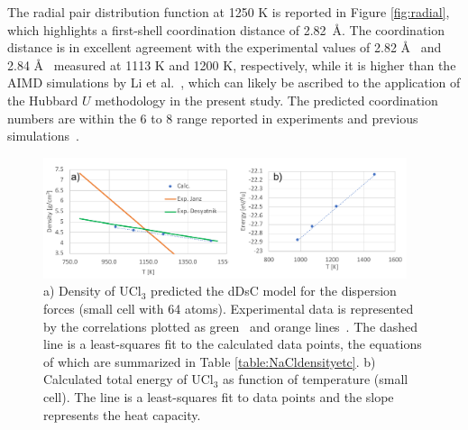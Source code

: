 \documentclass[preprint,3p,10pt,twocolumn,number,sort&compress]{elsarticle}
\begin{document}
The radial pair distribution function at 1250 K is reported in Figure \ref{fig:radial}, which highlights a first-shell coordination distance of 2.82~\AA. The coordination distance is in excellent agreement with the experimental values of 2.82 \AA~\cite{Neilson} and 2.84 \AA~\cite{Okamoto} measured at 1113 K and 1200 K, respectively, while it is higher than the AIMD simulations by Li et al.~\cite{Li}, which can likely be ascribed to the application of the Hubbard $U$ methodology in the present study. The predicted coordination numbers are within the 6 to 8 range reported in experiments and previous simulations~\cite{Li,Neilson,Okamoto}. %
 

\begin{figure}[htb]
\centering
\includegraphics[width=0.95\textwidth]{FIG4.pdf}
\caption{a) Density of UCl$_3$ predicted the dDsC model for the dispersion forces (small cell with 64 atoms). Experimental data is represented by the correlations plotted as green~\cite{Desyatnik} and orange lines~\cite{Janz1988}. The dashed line is a least-squares fit to the calculated data points, the equations of which are summarized in Table \ref{table:NaCldensityetc}. b) Calculated total energy of UCl$_3$ as function of temperature (small cell). The line is a least-squares fit to data points and the slope represents the heat capacity.} 
\label{fig:UCl3density}
\end{figure}
\end{document}
